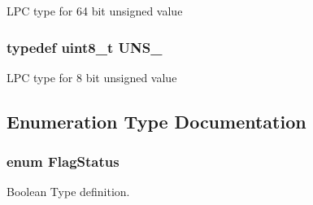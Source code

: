 L\+P\+C type for 64 bit unsigned value \hypertarget{group___l_p_c___types___public___types_ga7353117656180c64d2216c874998b98b}{
\subsubsection[{U\+N\+S\+\_\+8}]{\setlength{\rightskip}{0pt plus 5cm}typedef uint8\+\_\+t {\bf U\+N\+S\+\_}}}\label{group___l_p_c___types___public___types_ga7353117656180c64d2216c874998b98b}
L\+P\+C type for 8 bit unsigned value 

\subsection{Enumeration Type Documentation}
\hypertarget{group___l_p_c___types___public___types_ga89136caac2e14c55151f527ac02daaff}{
\subsubsection[{Flag\+Status}]{\setlength{\rightskip}{0pt plus 5cm}enum {\bf Flag\+Status}}}\label{group___l_p_c___types___public___types_ga89136caac2e14c55151f527ac02daaff}


Boolean Type definition. 

